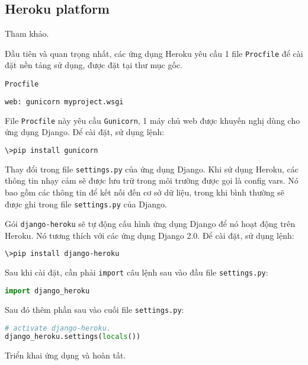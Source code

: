 \subsection{Heroku platform}
Tham khảo\cite{heroku}.
\par
Đầu tiên và quan trọng nhất, các ứng dụng Heroku yêu cầu 1 file \texttt{Procfile} để cài đặt nền tảng sử dụng, được đặt tại thư mục gốc.
\par
\texttt{Procfile}
\begin{lstlisting}[language=sh]
web: gunicorn myproject.wsgi
\end{lstlisting}
\par
File \texttt{Procfile} này yêu cầu \texttt{Gunicorn}, 1 máy chủ web được khuyến nghị dùng cho ứng dụng Django. Để cài đặt, sử dụng lệnh:
\begin{lstlisting}[language=bash]
\>pip install gunicorn
\end{lstlisting}
\par
Thay đổi trong file \texttt{settings.py} của ứng dụng Django. Khi sử dụng Heroku, các thông tin nhạy cảm sẽ được lưu trữ trong môi trường được gọi là config vars. Nó bao gồm các thông tin để kết nối đến cơ sở dữ liệu, trong khi bình thường sẽ được ghi trong file \texttt{settings.py} của Django.
\par
Gói \texttt{django-heroku} sẽ tự động cấu hình ứng dụng Django để nó hoạt động trên Heroku. Nó tương thích với các ứng dụng Django 2.0. Để cài đặt, sử dụng lệnh:
\begin{lstlisting}[language=bash]
\>pip install django-heroku
\end{lstlisting}
\par
Sau khi cài đặt, cần phải \texttt{import} câu lệnh sau vào đầu file \texttt{settings.py}:
\begin{lstlisting}[language=Python]
import django_heroku
\end{lstlisting}
\par
Sau đó thêm phần sau vào cuối file \texttt{settings.py}:
\begin{lstlisting}[language=Python]
# activate django-heroku.
django_heroku.settings(locals())
\end{lstlisting}
\par
Triển khai ứng dụng và hoàn tất.
